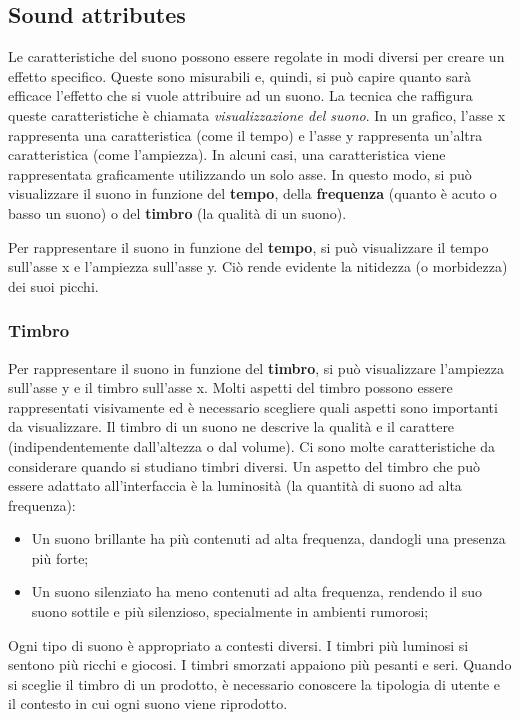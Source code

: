\documentclass[12pt, a4paper]{report}
\begin{document}
              \subsection{Sound attributes}
                 Le caratteristiche del suono possono essere regolate in modi diversi per creare un effetto specifico. Queste sono misurabili e, quindi, si può capire quanto sarà efficace l'effetto che si vuole attribuire ad un suono. La tecnica che raffigura
                 queste caratteristiche è chiamata \textit{visualizzazione del suono}. In un grafico, l'asse x rappresenta una caratteristica (come il tempo) e l'asse y rappresenta un'altra caratteristica  (come l'ampiezza). In alcuni casi, una caratteristica
                 viene rappresentata graficamente utilizzando un solo asse. In questo modo, si può visualizzare il suono in funzione del \textbf{tempo}, della \textbf{frequenza} (quanto è acuto o basso un suono) o del \textbf{timbro} (la qualità di un suono).

                 	Per rappresentare il suono in funzione del \textbf{tempo},  si può visualizzare il tempo sull'asse x e l'ampiezza sull'asse y. Ciò rende  evidente la nitidezza	(o morbidezza) dei suoi picchi.

                 	\subsubsection{Timbro}
                 	Per rappresentare il suono in funzione del \textbf{timbro}, si può visualizzare l'ampiezza sull'asse y e il timbro sull'asse x. Molti aspetti del timbro possono essere rappresentati visivamente ed è necessario scegliere quali aspetti sono
                 	importanti da visualizzare. Il timbro di un suono ne descrive la qualità e il carattere (indipendentemente dall'altezza o dal volume). Ci sono molte caratteristiche da considerare quando si studiano timbri diversi. Un aspetto
                 	del timbro che può essere adattato all’interfaccia è la luminosità (la quantità di suono ad alta frequenza):
                 	\begin{itemize}
                 		\item Un suono brillante ha più contenuti ad alta frequenza, dandogli una presenza più forte;
                 		\item Un suono silenziato ha meno contenuti ad alta frequenza, rendendo il suo suono sottile e più silenzioso, specialmente in ambienti rumorosi;
                 	\end{itemize}
                 	Ogni tipo di suono è appropriato a contesti diversi. I timbri più luminosi si sentono più ricchi e giocosi. I timbri smorzati appaiono più pesanti e seri.
                 	Quando si sceglie il timbro di un prodotto, è necessario conoscere la tipologia di utente e il contesto in cui ogni suono viene riprodotto.
\end{document}
